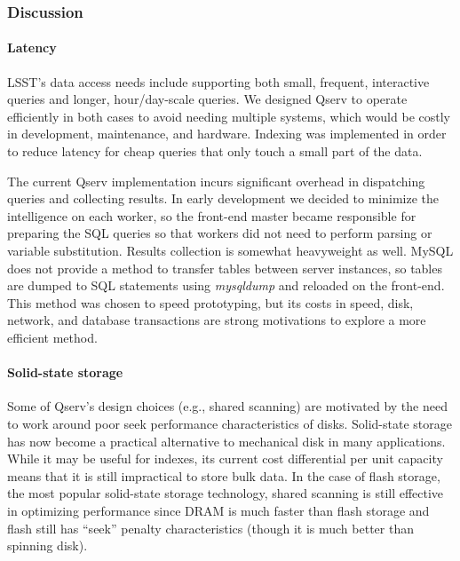 \documentclass[DM,lsstdraft,toc]{lsstdoc}
\begin{document}
\subsubsection{Discussion}\label{discussion-1}

\paragraph{Latency}\label{latency}

LSST's data access needs include supporting both small, frequent,
interactive queries and longer, hour/day-scale queries. We designed
Qserv to operate efficiently in both cases to avoid needing multiple
systems, which would be costly in development, maintenance, and
hardware. Indexing was implemented in order to reduce latency for cheap
queries that only touch a small part of the data.

The current Qserv implementation incurs significant overhead in
dispatching queries and collecting results. In early development we
decided to minimize the intelligence on each worker, so the front-end
master became responsible for preparing the SQL queries so that workers
did not need to perform parsing or variable substitution. Results
collection is somewhat heavyweight as well. MySQL does not provide a
method to transfer tables between server instances, so tables are dumped
to SQL statements using \emph{mysqldump} and reloaded on the front-end.
This method was chosen to speed prototyping, but its costs in speed,
disk, network, and database transactions are strong motivations to
explore a more efficient method.

\paragraph{Solid-state storage}\label{solid-state-storage}

Some of Qserv's design choices (e.g., shared scanning) are motivated by
the need to work around poor seek performance characteristics of disks.
Solid-state storage has now become a practical alternative to mechanical
disk in many applications. While it may be useful for indexes, its
current cost differential per unit capacity means that it is still
impractical to store bulk data. In the case of flash storage, the most
popular solid-state storage technology, shared scanning is still
effective in optimizing performance since DRAM is much faster than flash
storage and flash still has ``seek'' penalty characteristics (though it
is much better than spinning disk).
\end{document}
